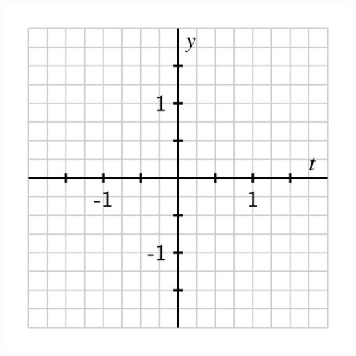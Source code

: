 \documentclass{ximera}
\begin{document}
\begin{problem}
\includegraphics[width=1\linewidth]{inverse-trig-blank-axes-arcsin.png}
\end{problem}
\end{document}
